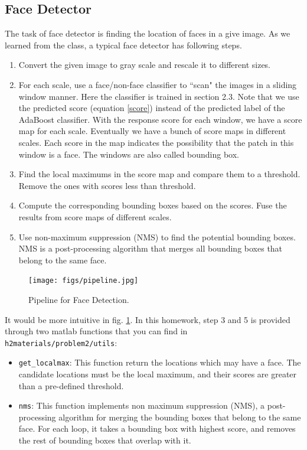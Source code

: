 \subsection{Face Detector}
The task of face detector is finding the location of faces in a give image. As we learned from the class, a typical face detector has following steps.

\begin{enumerate}
    \item Convert the given image to gray scale and rescale it  to different sizes.
    
    \item For each scale, use a face/non-face classifier to ``scan" the images in a sliding window manner. Here the classifier is trained in section 2.3. Note that we use the predicted score (equation \ref{score}) instead of the predicted label of the AdaBoost classifier. With the response score for each window, we have a score map for each scale. Eventually we have a bunch of score maps in different scales. Each score in the map indicates the possibility that the patch in this window is a face. The windows are also called bounding box.
    \item Find the local maximums in the score map and compare them to a threshold. Remove the ones with scores less than threshold. 
    \item Compute the corresponding bounding boxes based on the scores. Fuse the results from score maps of different scales.
    \item Use non-maximum suppression (NMS) to find the potential bounding boxes. NMS is a post-processing algorithm that merges all bounding boxes that belong to the same face.
\end{enumerate}


\begin{figure}[h!]
    \centering
    \texttt{[image: figs/pipeline.jpg]}
    \caption{Pipeline for Face Detection.}
    \label{pipeline}
\end{figure}

It would be more intuitive in fig. \ref{pipeline}. In this homework, step 3 and 5 is provided through two matlab functions that you can find in \texttt{h2materials/problem2/utils}:
\begin{itemize}
    \item \texttt{get\_localmax}: This function return the locations which may have a face. The candidate locations must be the local maximum, and their scores are greater than a pre-defined threshold.
    \item \texttt{nms}: This function implements non maximum suppression (NMS), a post-processing algorithm for merging the bounding boxes that belong to the same face. For each loop, it takes a bounding box with highest score, and removes the rest of bounding boxes that overlap with it.
\end{itemize}

